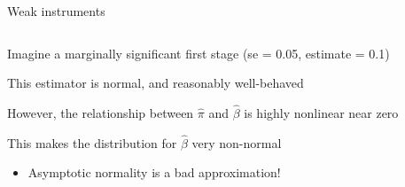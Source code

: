 \documentclass[notes,11pt, aspectratio=169]{beamer}
\newenvironment{wideitemize}{\itemize\addtolength{\itemsep}{10pt}}{\enditemize}
\begin{document}
\begin{frame}{Weak instruments}
  \begin{columns}[T] %
    \begin{column}{0.5\textwidth}
  \begin{wideitemize}
  \item<1-> Imagine a marginally significant first stage (se = 0.05, estimate = 0.1)
  \item<1-> This estimator is normal, and reasonably well-behaved
  \item<2-> However, the relationship between $\hat{\pi}$ and
    $\hat{\beta}$ is highly nonlinear near zero
  \item<3-> This makes the distribution for $\hat{\beta}$ very
    non-normal
    \begin{itemize}
    \item Asymptotic normality is a bad approximation!
    \end{itemize}
  \end{wideitemize}
\end{column}
\begin{column}{0.5\textwidth}

\end{column}
\end{columns}
\end{frame}
\end{document}
